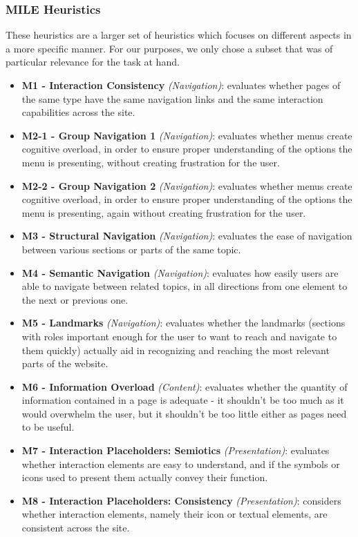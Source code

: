 \documentclass[11pt]{article} %
\begin{document}
\subsubsection{MILE Heuristics}
These heuristics are a larger set of heuristics which focuses on different aspects in a more specific manner. For our purposes, we only chose a subset that was of particular relevance for the task at hand.
\begin{itemize}
    \item \textbf{M1 - Interaction Consistency} \textit{(Navigation)}: evaluates whether pages of the same type have the same navigation links and the same interaction capabilities across the site.
    \item \textbf{M2-1 - Group Navigation 1} \textit{(Navigation)}: evaluates whether menus create cognitive overload, in order to ensure proper understanding of the options the menu is presenting, without creating frustration for the user.
    \item \textbf{M2-2 - Group Navigation 2} \textit{(Navigation)}: evaluates whether menus create cognitive overload, in order to ensure proper understanding of the options the menu is presenting, again without creating frustration for the user. 
    \item \textbf{M3 - Structural Navigation} \textit{(Navigation)}: evaluates the ease of navigation between various sections or parts of the same topic.
    \item \textbf{M4 - Semantic Navigation} \textit{(Navigation)}: evaluates how easily users are able to navigate between related topics, in all directions from one element to the next or previous one.
    \item \textbf{M5 - Landmarks} \textit{(Navigation)}: evaluates whether the landmarks (sections with roles important enough for the user to want to reach and navigate to them quickly) actually aid in recognizing and reaching the most relevant parts of the website.
    \item \textbf{M6 - Information Overload} \textit{(Content)}: evaluates whether the quantity of information contained in a page is adequate - it shouldn't be too much as it would overwhelm the user, but it shouldn't be too little either as pages need to be useful.
    \item \textbf{M7 - Interaction Placeholders: Semiotics} \textit{(Presentation)}: evaluates whether interaction elements are easy to understand, and if the symbols or icons used to present them actually convey their function.
    \item \textbf{M8 - Interaction Placeholders: Consistency} \textit{(Presentation)}: considers whether interaction elements, namely their icon or textual elements, are consistent across the site.

\end{itemize}
\end{document}
